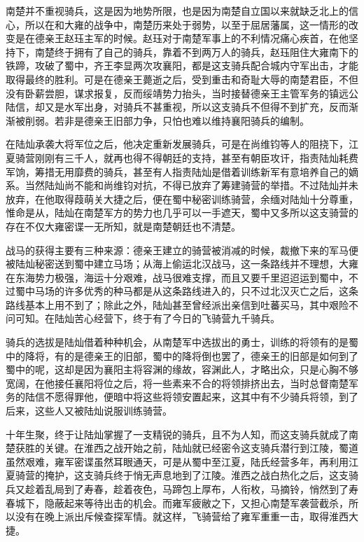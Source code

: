 南楚并不重视骑兵，这是因为地势所限，也是因为南楚自立国以来就缺乏北上的信心，所以在和大雍的战争中，南楚历来处于弱势，以至于屈居藩属，这一情形的改变是在德亲王赵珏主军的时候。赵珏对于南楚军事上的不利情况痛心疾首，在他坚持下，南楚终于拥有了自己的骑兵，靠着不到两万人的骑兵，赵珏阻住大雍南下的铁蹄，攻破了蜀中，齐王李显两次攻襄阳，都是这支骑兵配合城内守军出击，才能取得最终的胜利。可是在德亲王薨逝之后，受到重击和奇耻大辱的南楚君臣，不但没有卧薪尝胆，谋求报复，反而绥靖势力抬头，当时接替德亲王主管军务的镇远公陆信，却又是水军出身，对骑兵不甚重视，所以这支骑兵不但得不到扩充，反而渐渐被削弱。若非是德亲王旧部力争，只怕也难以维持襄阳骑兵的编制。

在陆灿承袭大将军位之后，他决定重新发展骑兵，可是在尚维钧等人的阻挠下，江夏骑营刚刚有三千人，就再也得不得朝廷的支持，甚至有朝臣攻讦，指责陆灿耗费军饷，筹措无用靡费的骑兵，甚至有人指责陆灿是借着训练新军有意培养自己的嫡系。当然陆灿尚不能和尚维钧对抗，不得已放弃了筹建骑营的举措。不过陆灿并未放弃，在他取得葭萌关大捷之后，便在蜀中秘密训练骑营，余缅对陆灿十分尊重，惟命是从，陆灿在南楚军方的势力也几乎可以一手遮天，蜀中又多所以这支骑营的存在不仅大雍密谍一无所知，就是南楚朝廷也不清楚。

战马的获得主要有三种来源：德亲王建立的骑营被消减的时候，裁撤下来的军马便被陆灿秘密送到蜀中建立马场；从海上偷运北汉战马，这一条路线并不理想，大雍在东海势力极强，海运十分艰难，战马很难支撑，而且又要千里迢迢运到蜀中，不过蜀中马场的许多优秀的种马都是从这条路线进入的，只不过北汉灭亡之后，这条路线基本上用不到了；除此之外，陆灿甚至曾经派出亲信到吐蕃买马，其中艰险不问可知。在陆灿苦心经营下，终于有了今日的飞骑营九千骑兵。

骑兵的选拔是陆灿借着种种机会，从南楚军中选拔出的勇士，训练的将领有的是蜀中的降将，有的是德亲王的旧部，蜀中的降将倒也罢了，德亲王的旧部是如何到了蜀中的呢，这却是因为襄阳主将容渊的缘故，容渊此人，才略出众，只是心胸不够宽阔，在他接任襄阳将位之后，将一些素来不合的将领排挤出去，当时总督南楚军务的陆信不愿得罪他，便暗中将这些将领安置起来，这其中有不少骑兵将领，到了后来，这些人又被陆灿说服训练骑营。

十年生聚，终于让陆灿掌握了一支精锐的骑兵，且不为人知，而这支骑兵就成了南楚获胜的关键。在淮西之战开始之前，陆灿就已经密令这支骑兵潜行到江陵，蜀道虽然艰难，雍军密谍虽然耳眼通天，可是从蜀中至江夏，陆氏经营多年，再利用江夏骑营的掩护，这支骑兵终于悄无声息地到了江陵。淮西之战白热化之后，这支骑兵又趁着乱局到了寿春，趁着夜色，马蹄包上厚布，人衔枚，马摘铃，悄然到了寿春城下，隐蔽起来等待出击的机会。而雍军疲敝之下，又担心南楚军袭营截杀，所以没有在晚上派出斥候查探军情。就这样，飞骑营给了雍军重重一击，取得淮西大捷。

